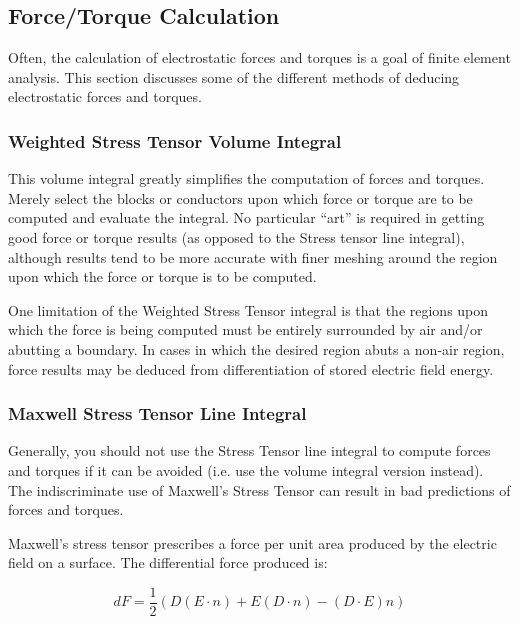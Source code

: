 \documentclass[12pt]{report}
\begin{document}
\subsection{Force/Torque Calculation} \label{forcetorquesection}

Often, the calculation of electrostatic forces and torques is a goal of
finite element analysis. This section discusses some of the
different methods of deducing electrostatic forces and torques.

\subsubsection{Weighted Stress Tensor Volume Integral}

This volume integral greatly simplifies the computation of forces and
torques. Merely select the blocks or conductors upon which force or torque
are to be computed and evaluate the integral. No particular ``art'' is
required in getting good force or torque results (as opposed to the Stress
tensor line integral), although results tend to be more accurate with finer
meshing around the region upon which the force or torque is to be computed.

One limitation of the Weighted Stress Tensor integral is that the regions
upon which the force is being computed must be entirely surrounded by air
and/or abutting a boundary. In cases in which the desired region abuts a
non-air region, force results may be deduced from differentiation of stored
electric field energy.

\subsubsection{Maxwell Stress Tensor Line Integral}

Generally, you should not use the Stress Tensor line integral to compute
forces and torques if it can be avoided (i.e. use the volume integral
version instead). The indiscriminate use of Maxwell's Stress Tensor can result
in bad predictions of forces and torques.

Maxwell's stress tensor prescribes a force per unit area produced by the
electric field on a surface. The differential force produced is:

\begin{equation}
\label{eq8}
dF = \frac{1}{2}\left( {D\left( {E \cdot n} \right) + E\left( {D \cdot n}
\right) - \left( {D \cdot E} \right)n} \right)
\end{equation}
\end{document}
